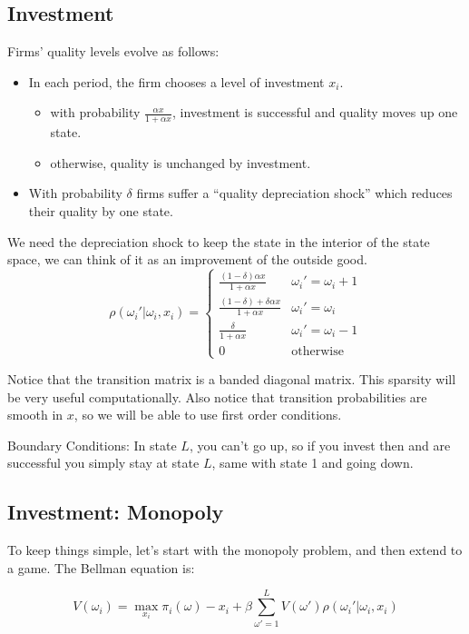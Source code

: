 \documentclass[twoside]{article}
\begin{document}
\subsection{Investment}

Firms' quality levels evolve as follows:
\begin{itemize}
\item In each period, the firm chooses a level of investment $x_i$. 
\begin{itemize}
\item with probability $\frac{\alpha x}{1 + \alpha x}$, investment is successful and quality moves up one state. 
\item otherwise, quality is unchanged by investment. 
\end{itemize}
\item With probability $\delta$ firms suffer a ``quality depreciation shock'' which reduces their quality by one state. 
\end{itemize}

We need the depreciation shock to keep the state in the interior of the state space, we can think of it as an improvement of the outside good. 
$$
\rho(\omega_i' | \omega_i, x_i) = \begin{cases}
\frac{(1-\delta)\alpha x}{1 + \alpha x} & \omega_i' = \omega_i + 1 \\
\frac{(1-\delta) + \delta \alpha x}{1 + \alpha x} & \omega_i' = \omega_i \\
\frac{\delta}{1 + \alpha x} & \omega_i' = \omega_i - 1 \\
0 & \mbox{otherwise}
\end{cases}
$$

Notice that the transition matrix is a banded diagonal matrix. This sparsity will be very useful computationally. 
Also notice that transition probabilities are smooth in $x$, so we will be able to use first order conditions. 

Boundary Conditions: In state $L$, you can't go up, so if you invest then and are successful you simply stay at state $L$, same with state 1 and going down. 

\subsection{Investment: Monopoly}

To keep things simple, let's start with the monopoly problem, and then extend to a game. 
The Bellman equation is: 

$$ V(\omega_i) = \max_{x_i} \pi_i(\omega) - x_i + \beta \sum_{\omega' = 1}^L V(\omega') \rho(\omega_i' | \omega_i, x_i) $$
\end{document}

